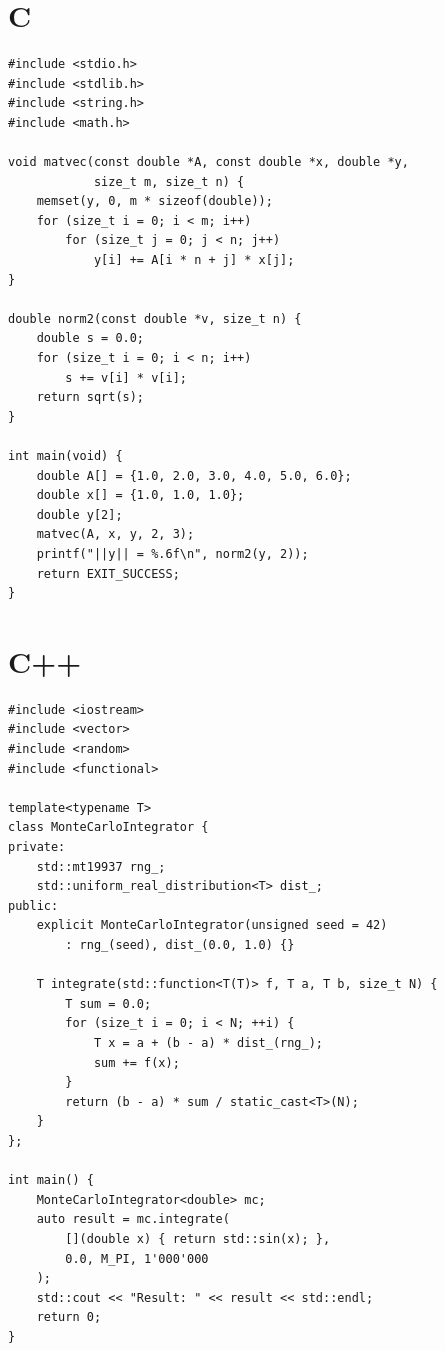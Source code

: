 \section{C}

\begin{lstlisting}[style=c, caption={Producto matriz-vector}]
#include <stdio.h>
#include <stdlib.h>
#include <string.h>
#include <math.h>

void matvec(const double *A, const double *x, double *y,
            size_t m, size_t n) {
    memset(y, 0, m * sizeof(double));
    for (size_t i = 0; i < m; i++)
        for (size_t j = 0; j < n; j++)
            y[i] += A[i * n + j] * x[j];
}

double norm2(const double *v, size_t n) {
    double s = 0.0;
    for (size_t i = 0; i < n; i++)
        s += v[i] * v[i];
    return sqrt(s);
}

int main(void) {
    double A[] = {1.0, 2.0, 3.0, 4.0, 5.0, 6.0};
    double x[] = {1.0, 1.0, 1.0};
    double y[2];
    matvec(A, x, y, 2, 3);
    printf("||y|| = %.6f\n", norm2(y, 2));
    return EXIT_SUCCESS;
}
\end{lstlisting}

\section{C++}

\begin{lstlisting}[style=cpp, caption={Integrador de Monte Carlo con templates}]
#include <iostream>
#include <vector>
#include <random>
#include <functional>

template<typename T>
class MonteCarloIntegrator {
private:
    std::mt19937 rng_;
    std::uniform_real_distribution<T> dist_;
public:
    explicit MonteCarloIntegrator(unsigned seed = 42)
        : rng_(seed), dist_(0.0, 1.0) {}

    T integrate(std::function<T(T)> f, T a, T b, size_t N) {
        T sum = 0.0;
        for (size_t i = 0; i < N; ++i) {
            T x = a + (b - a) * dist_(rng_);
            sum += f(x);
        }
        return (b - a) * sum / static_cast<T>(N);
    }
};

int main() {
    MonteCarloIntegrator<double> mc;
    auto result = mc.integrate(
        [](double x) { return std::sin(x); },
        0.0, M_PI, 1'000'000
    );
    std::cout << "Result: " << result << std::endl;
    return 0;
}
\end{lstlisting}

